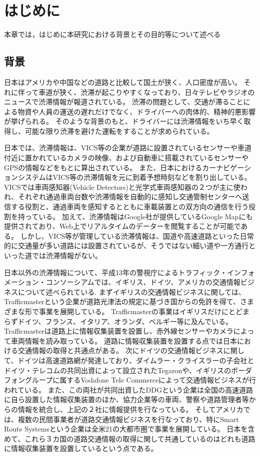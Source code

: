 \chapter{はじめに}
本章では，はじめに本研究における背景とその目的等について述べる
\newpage
\section{背景}
日本はアメリカや中国などの道路と比較して国土が狭く、人口密度が高い。
それに伴って車道が狭く、渋滞が起こりやすくなっており、日々テレビやラジオのニュースで渋滞情報が報道されている。
渋滞の問題として、交通が滞ることによる物資や人員の運送の遅れだけでなく、ドライバーへの肉体的、精神的悪影響が挙げられる。
そのような背景のもと、ドライバーには渋滞情報をいち早く取得し、可能な限り渋滞を避けた運転をすることが求められている。

日本では、渋滞情報は、VICS等の企業が道路に設置されているセンサーや車道付近に置かれているカメラの映像、および自動車に搭載されているセンサーやGPSの情報などをもとに算出されている。
また、日本におけるカーナビゲーションシステムはVICS等の渋滞情報を元に到着予想時刻などを割り出している。
VICSでは車両感知器(Vehicle Detectors)と光学式車両感知器の２つが主に使われ、それぞれ通過車両台数や渋滞情報を自動的に感知し交通管制センターへ送信する役割と、通過車両を感知するとともに車載装置との双方向の通信を行う役割を持っている。
加えて、渋滞情報はGoogle社が提供しているGoogle Mapにも提供されており、Web上でリアルタイムのデーターを閲覧することが可能である。
しかし、VICS等が管理している渋滞情報は、国道や高速道路といった日常的に交通量が多い道路には設置されているが、そうではない細い道や一方通行といった道では渋滞情報がない。

日本以外の渋滞情報について、平成13年の警視庁によるトラフィック・インフォメーション・コンソーシアムでは、イギリス、ドイツ、アメリカの交通情報ビジネスについて述べられている\cite{traffic_buisiness}.
まずイギリスの交通情報ビジネスに関しては、Trafficmasterという企業が道路光津法の規定に基づき国からの免許を得て、さまざまな形で事業を展開している。
Trafficmasterの事業はイギリスだけにとどまらずドイツ、フランス、イタリア、オランダ、ベルギー等に及んでいる。
Trafficmasterは道路上に情報収集装置を設置し、赤外線センサーやカメラによって車両情報を読み取っている。
道路に情報収集装置を設置する点では日本における交通情報の取得と共通点がある。
次にドイツの交通情報ビジネスに関して、ドイツは高速道路網が発達しており、ダイムラー・クライスラーの子会社とドイツ・テレコムの共同出資によって設立されたTegaronや、イギリスのボーダフォングループに属するVodafone Tele Commerceによって交通情報ビジネスが行われている。
また、この両社が共同出資したDDGという企業は全国の高速道路に自ら設置した情報収集装置のほか、協力企業等の車両、警察や道路管理者等からの情報を統合し、上記の２社に情報提供を行なっている。
そしてアメリカでは、複数の民間事業者が道路交通情報ビジネスを行なっており、特にSmart Route Systemsという企業は全米21の大都市圏で事業を展開している。
日本を含めて、これら３カ国の道路交通情報の取得に関して共通しているのはどれも道路に情報収集装置を設置しているという点である。


